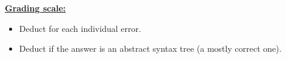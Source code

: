 \documentclass[11pt,fleqn]{article}
\begin{document}
\begin{enumerate}
          \begin{multicols}{2}

            \centering



          \end{multicols}

          \begin{info}{\textbf{\underline{Grading scale:}}}

            \begin{itemize}

              \addtolength{\itemsep}{3mm}

              \item Deduct  for each individual error.

              \item Deduct  if the answer is an abstract syntax tree
                    (a mostly correct one).

            \end{itemize}

          \end{info}

  \end{enumerate}
\end{document}
